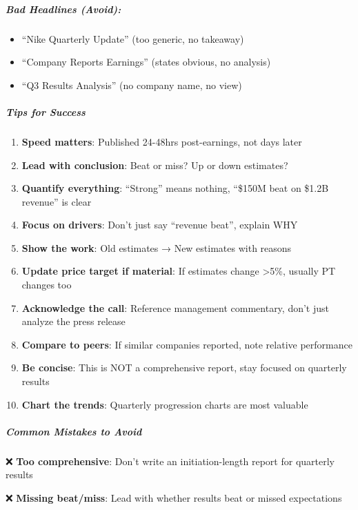 \documentclass[11pt]{article}
\begin{document}
\subparagraph{Bad Headlines (Avoid):}\mbox{}\par
\begin{itemize}[leftmargin=*,itemsep=2pt,topsep=2pt]
\item {} ``Nike Quarterly Update'' (too generic, no takeaway)
\item {} ``Company Reports Earnings'' (states obvious, no analysis)
\item {} ``Q3 Results Analysis'' (no company name, no view)
\end{itemize}

\subparagraph{Tips for Success}\mbox{}\par

\begin{enumerate}[leftmargin=*,itemsep=2pt,topsep=2pt]
\item {} \textbf{Speed matters}: Published 24-48hrs post-earnings, not days later
\item {} \textbf{Lead with conclusion}: Beat or miss? Up or down estimates?
\item {} \textbf{Quantify everything}: ``Strong'' means nothing, ``\$150M beat on \$1.2B revenue'' is clear
\item {} \textbf{Focus on drivers}: Don't just say ``revenue beat'', explain WHY
\item {} \textbf{Show the work}: Old estimates → New estimates with reasons
\item {} \textbf{Update price target if material}: If estimates change >5\%, usually PT changes too
\item {} \textbf{Acknowledge the call}: Reference management commentary, don't just analyze the press release
\item {} \textbf{Compare to peers}: If similar companies reported, note relative performance
\item {} \textbf{Be concise}: This is NOT a comprehensive report, stay focused on quarterly results
\item {} \textbf{Chart the trends}: Quarterly progression charts are most valuable
\end{enumerate}

\subparagraph{Common Mistakes to Avoid}\mbox{}\par

❌ \textbf{Too comprehensive}: Don't write an initiation-length report for quarterly results


❌ \textbf{Missing beat/miss}: Lead with whether results beat or missed expectations
\end{document}
